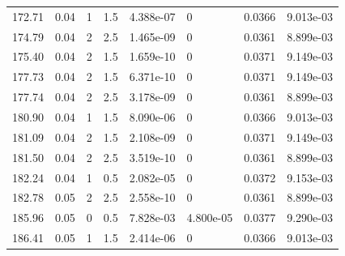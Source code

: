 \documentclass[preview]{standalone}
\begin{document}
{{{\begin{tabular}{L{1.2cm}C{1.2cm} C{0.3cm}C{0.5cm} C{1.4cm}C{1.4cm} C{1.4cm}C{1.4cm}}
  172.71  &  0.04  & 1     & 1.5 &  4.388e-07  & 0  & 0.0366 &  9.013e-03   \\ 
  174.79  &  0.04  & 2     & 2.5 &  1.465e-09  & 0  & 0.0361 &  8.899e-03   \\ 
  175.40  &  0.04  & 2     & 1.5 &  1.659e-10  & 0  & 0.0371 &  9.149e-03   \\ 
  177.73  &  0.04  & 2     & 1.5 &  6.371e-10  & 0  & 0.0371 &  9.149e-03   \\ 
  177.74  &  0.04  & 2     & 2.5 &  3.178e-09  & 0  & 0.0361 &  8.899e-03   \\ 
  180.90  &  0.04  & 1     & 1.5 &  8.090e-06  & 0  & 0.0366 &  9.013e-03   \\ 
  181.09  &  0.04  & 2     & 1.5 &  2.108e-09  & 0  & 0.0371 &  9.149e-03   \\ 
  181.50  &  0.04  & 2     & 2.5 &  3.519e-10  & 0  & 0.0361 &  8.899e-03   \\ 
  182.24  &  0.04  & 1     & 0.5 &  2.082e-05  & 0  & 0.0372 &  9.153e-03   \\ 
  182.78  &  0.05  & 2     & 2.5 &  2.558e-10  & 0  & 0.0361 &  8.899e-03   \\ 
  185.96  &  0.05  & 0     & 0.5 &  7.828e-03  & 4.800e-05  & 0.0377 &  9.290e-03   \\ 
  186.41  &  0.05  & 1     & 1.5 &  2.414e-06  & 0  & 0.0366 &  9.013e-03   \\ 
\hline 
\end{tabular} 

}}}
\end{document}
